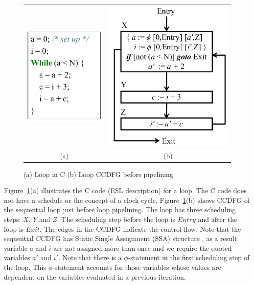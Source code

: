 \begin{figure}[H]
\begin{center}
\begin{tabular}{cc}
\includegraphics[height=2in]{fig-proposal/C-code}
& \hspace{1cm}
\includegraphics[height=3in]{fig-proposal/seq-ccdfg-1}
\\
(a) & \hspace{2cm} (b)
\end{tabular}
\end{center}
\caption{(a) Loop in C (b) Loop CCDFG before pipelining}
\label{fig:high-level-synthesis-1}
\end{figure}

Figure~\ref{fig:high-level-synthesis-1}(a) illustrates the C
code (ESL description) for a loop.  The C code does not have
a schedule or the concept of a clock cycle.
Figure~\ref{fig:high-level-synthesis-1}(b) shows CCDFG of the
sequential loop just before loop pipelining. The loop has
three scheduling steps: $X$, $Y$ and $Z$.  The scheduling
step before the loop is $Entry$ and after the loop is
$Exit$. The edges  in the CCDFG indicate the control flow.
Note that the sequential CCDFG has Static Single Assignment (SSA) structure
, as a result variable $a$ and $i$ are not assigned 
more than once and we require the quoted variables $a'$ and $i'$.
Note that there is a $\phi$-statement in the
first scheduling step of the loop.  This $\phi$-statement
accounts for those variables whose values are dependent on
the variables evaluated in a previous iteration.

